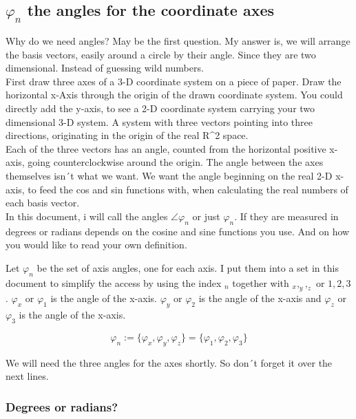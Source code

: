 \documentclass[a4paper]{article}
\begin{document}
\subsection{$\varphi_n$ the angles for the coordinate axes}

Why do we need angles? May be the first question. My answer is, we will arrange the basis vectors, 
easily around a circle by their angle. Since they are two dimensional. Instead of guessing wild numbers.\\

First draw three axes of a 3-D coordinate system on a piece of paper. Draw the horizontal x-Axis through the origin of the drawn coordinate system. You could directly add the y-axis, to see a 2-D coordinate system carrying your two dimensional 3-D system. A system with three vectors pointing into three directions, originating in the origin of the real R^2 space.\\

Each of the three vectors has an angle, counted from the horizontal positive x-axis, going counterclockwise around the origin. The
angle between the axes themselves isn´t what we want. We want the angle beginning on the real 2-D x-axis, to feed the cos and sin functions with, when calculating the real numbers of each basis vector.\\

In this document, i will call the angles $\angle \varphi_n$ or just $\varphi_n$. If they are measured in degrees or radians depends
on the cosine and sine functions you use. And on how you would like to read your own definition.

Let $\varphi_n$ be the set of axis angles, one for each axis. I put them into a set in this document to simplify the access by
using the index $_n$ together with $_x, _y, _z$ or $1,2,3$. $\varphi_x$ or $\varphi_1$ is the angle of the x-axis. $\varphi_y$ or $\varphi_2$ is the angle of the x-axis and $\varphi_z$ or $\varphi_3$ is the angle of the x-axis. 


\begin{displaymath}
\varphi_n := \{\varphi_x, \varphi_y, \varphi_z\} = \{ \varphi_1, \varphi_2, \varphi_3 \}
\end{displaymath}

We will need the three angles for the axes shortly. So don´t forget it over the next lines.


\subsubsection{Degrees or radians?}
\end{document}
